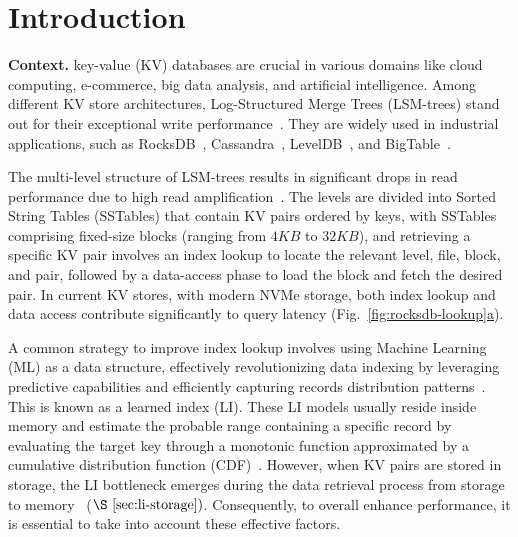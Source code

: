 \section{Introduction}
\label{sec:intro}
\noindent
\textbf{Context.}  key-value (KV) databases are crucial in various domains like cloud computing, e-commerce, big data analysis, and artificial intelligence. Among different KV store architectures, Log-Structured Merge Trees (LSM-trees) stand out for their exceptional write performance~\cite{CliffGuard}. They are widely used in industrial applications, such as RocksDB~\cite{rocksdbpaper}, Cassandra~\cite{lakshman2010cassandra}, LevelDB~\cite{leveldb}, and BigTable~\cite{chang2008bigtable}. 

The multi-level structure of LSM-trees results in significant drops in read performance due to high read amplification~\cite{TridentKV2022, heidari2150metahive}. The levels are divided into Sorted String Tables (SSTables) that contain KV pairs ordered by keys, with SSTables comprising fixed-size blocks (ranging from $4KB$ to $32KB$), and retrieving a specific KV pair involves an index lookup to locate the relevant level, file, block, and pair, followed by a data-access phase to load the block and fetch the desired pair. In current KV stores, with modern NVMe storage, both index lookup and data access contribute significantly to query latency (Fig.~\hyperref[fig:rocksdb-lookup]{\ref*{fig:rocksdb-lookup}a}).

A common strategy to improve index lookup involves using Machine Learning (ML) as a data structure, effectively revolutionizing data indexing by leveraging predictive capabilities and efficiently capturing records distribution patterns~\cite{heidari2024uplif,ding2020alex, ferragina2020pgm, galakatos2019fiting, heidari2024record,heidari2019holodetect}. This is known as a learned index (LI). These LI models usually reside inside memory and estimate the probable range containing a specific record by evaluating the target key through a monotonic function approximated by a cumulative distribution function (CDF)~\cite{heidari2020sampling, livshits2020approximate, case2023memory}. However, when KV pairs are stored in storage, the LI bottleneck emerges during the data retrieval process from storage to memory~\cite{lidisk2024sigmod, wipe22024, apex2021, liDisk2024}
($\S~\ref{sec:li-storage})$. Consequently, to overall enhance performance, it is essential to take into account these effective factors. 

